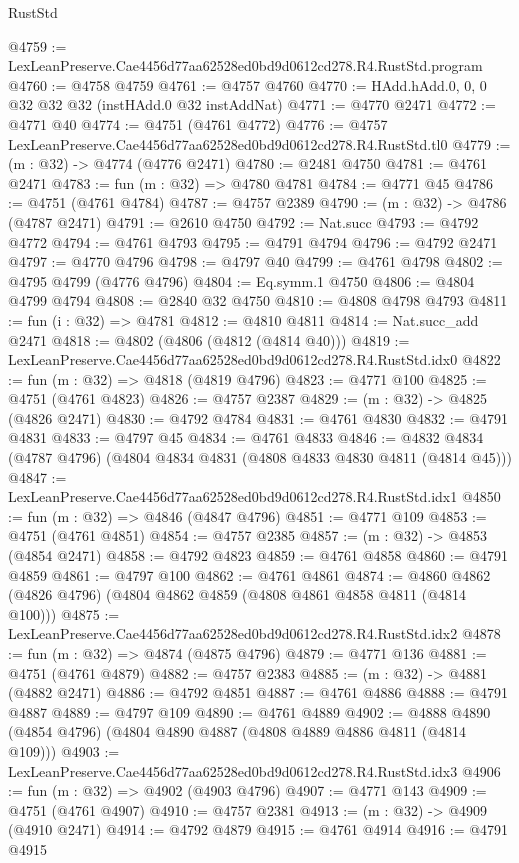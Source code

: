 \begin{lexlean}{RustStd}
\begin{coremodule}
@4759 := LexLeanPreserve.Cae4456d77aa62528ed0bd9d0612cd278.R4.RustStd.program
@4760 := @4758 @4759
@4761 := @4757 @4760
@4770 := HAdd.hAdd.{0, 0, 0} @32 @32 @32 (instHAdd.{0} @32 instAddNat)
@4771 := @4770 @2471
@4772 := @4771 @40
@4774 := @4751 (@4761 @4772)
@4776 := @4757 LexLeanPreserve.Cae4456d77aa62528ed0bd9d0612cd278.R4.RustStd.tl0
@4779 := (m : @32) -> @4774 (@4776 @2471)
@4780 := @2481 @4750
@4781 := @4761 @2471
@4783 := fun (m : @32) => @4780 @4781
@4784 := @4771 @45
@4786 := @4751 (@4761 @4784)
@4787 := @4757 @2389
@4790 := (m : @32) -> @4786 (@4787 @2471)
@4791 := @2610 @4750
@4792 := Nat.succ
@4793 := @4792 @4772
@4794 := @4761 @4793
@4795 := @4791 @4794
@4796 := @4792 @2471
@4797 := @4770 @4796
@4798 := @4797 @40
@4799 := @4761 @4798
@4802 := @4795 @4799 (@4776 @4796)
@4804 := Eq.symm.{1} @4750
@4806 := @4804 @4799 @4794
@4808 := @2840 @32 @4750
@4810 := @4808 @4798 @4793
@4811 := fun (i : @32) => @4781
@4812 := @4810 @4811
@4814 := Nat.succ_add @2471
@4818 := @4802 (@4806 (@4812 (@4814 @40)))
@4819 := LexLeanPreserve.Cae4456d77aa62528ed0bd9d0612cd278.R4.RustStd.idx0
@4822 := fun (m : @32) => @4818 (@4819 @4796)
@4823 := @4771 @100
@4825 := @4751 (@4761 @4823)
@4826 := @4757 @2387
@4829 := (m : @32) -> @4825 (@4826 @2471)
@4830 := @4792 @4784
@4831 := @4761 @4830
@4832 := @4791 @4831
@4833 := @4797 @45
@4834 := @4761 @4833
@4846 := @4832 @4834 (@4787 @4796) (@4804 @4834 @4831 (@4808 @4833 @4830 @4811 (@4814 @45)))
@4847 := LexLeanPreserve.Cae4456d77aa62528ed0bd9d0612cd278.R4.RustStd.idx1
@4850 := fun (m : @32) => @4846 (@4847 @4796)
@4851 := @4771 @109
@4853 := @4751 (@4761 @4851)
@4854 := @4757 @2385
@4857 := (m : @32) -> @4853 (@4854 @2471)
@4858 := @4792 @4823
@4859 := @4761 @4858
@4860 := @4791 @4859
@4861 := @4797 @100
@4862 := @4761 @4861
@4874 := @4860 @4862 (@4826 @4796) (@4804 @4862 @4859 (@4808 @4861 @4858 @4811 (@4814 @100)))
@4875 := LexLeanPreserve.Cae4456d77aa62528ed0bd9d0612cd278.R4.RustStd.idx2
@4878 := fun (m : @32) => @4874 (@4875 @4796)
@4879 := @4771 @136
@4881 := @4751 (@4761 @4879)
@4882 := @4757 @2383
@4885 := (m : @32) -> @4881 (@4882 @2471)
@4886 := @4792 @4851
@4887 := @4761 @4886
@4888 := @4791 @4887
@4889 := @4797 @109
@4890 := @4761 @4889
@4902 := @4888 @4890 (@4854 @4796) (@4804 @4890 @4887 (@4808 @4889 @4886 @4811 (@4814 @109)))
@4903 := LexLeanPreserve.Cae4456d77aa62528ed0bd9d0612cd278.R4.RustStd.idx3
@4906 := fun (m : @32) => @4902 (@4903 @4796)
@4907 := @4771 @143
@4909 := @4751 (@4761 @4907)
@4910 := @4757 @2381
@4913 := (m : @32) -> @4909 (@4910 @2471)
@4914 := @4792 @4879
@4915 := @4761 @4914
@4916 := @4791 @4915

\end{coremodule}
\end{lexlean}

